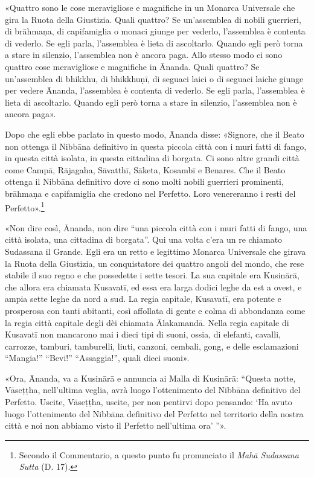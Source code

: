 
«Quattro sono le cose meravigliose e magnifiche in un Monarca Universale che
gira la Ruota della Giustizia. Quali quattro? Se un’assemblea di nobili
guerrieri, di brāhmaṇa, di capifamiglia o monaci giunge per vederlo, l’assemblea
è contenta di vederlo. Se egli parla, l’assemblea è lieta di ascoltarlo. Quando
egli però torna a stare in silenzio, l’assemblea non è ancora paga. Allo stesso
modo ci sono quattro cose meravigliose e magnifiche in Ānanda. Quali quattro? Se
un’assemblea di bhikkhu, di bhikkhuṇī, di seguaci laici o di seguaci laiche
giunge per vedere Ānanda, l’assemblea è contenta di vederlo. Se egli parla,
l’assemblea è lieta di ascoltarlo. Quando egli però torna a stare in silenzio,
l’assemblea non è ancora paga».


Dopo che egli ebbe parlato in questo modo, Ānanda disse: «Signore, che il Beato
non ottenga il Nibbāna definitivo in questa piccola città con i muri fatti di
fango, in questa città isolata, in questa cittadina di borgata. Ci sono altre
grandi città come Campā, Rājagaha, Sāvatthī, Sāketa, Kosambī e Benares. Che il
Beato ottenga il Nibbāna definitivo dove ci sono molti nobili guerrieri
prominenti, brāhmaṇa e capifamiglia che credono nel Perfetto. Loro venereranno i
resti del Perfetto».\footnote{Secondo il Commentario, a questo punto fu
  pronunciato il \emph{Mahā Sudassana Sutta} (D. 17).}

«Non dire così, Ānanda, non dire “una piccola città con i muri fatti di fango,
una città isolata, una cittadina di borgata”. Qui una volta c’era un re chiamato
Sudassana il Grande. Egli era un retto e legittimo Monarca Universale che girava
la Ruota della Giustizia, un conquistatore dei quattro angoli del mondo, che
rese stabile il suo regno e che possedette i sette tesori. La sua capitale era
Kusinārā, che allora era chiamata Kusavatī, ed essa era larga dodici leghe da
est a ovest, e ampia sette leghe da nord a sud. La regia capitale, Kusavatī, era
potente e prosperosa con tanti abitanti, così affollata di gente e colma di
abbondanza come la regia città capitale degli dèi chiamata Ālakamandā. Nella
regia capitale di Kusavatī non mancarono mai i dieci tipi di suoni, ossia, di
elefanti, cavalli, carrozze, tamburi, tamburelli, liuti, canzoni, cembali, gong,
e delle esclamazioni “Mangia!” “Bevi!” “Assaggia!”, quali dieci suoni».


«Ora, Ānanda, va a Kusinārā e annuncia ai Malla di Kusinārā: “Questa notte,
Vāseṭṭha, nell’ultima veglia, avrà luogo l’ottenimento del Nibbāna definitivo
del Perfetto. Uscite, Vāseṭṭha, uscite, per non pentirvi dopo pensando: ‘Ha
avuto luogo l’ottenimento del Nibbāna definitivo del Perfetto nel territorio
della nostra città e noi non abbiamo visto il Perfetto nell’ultima ora’ ”».

